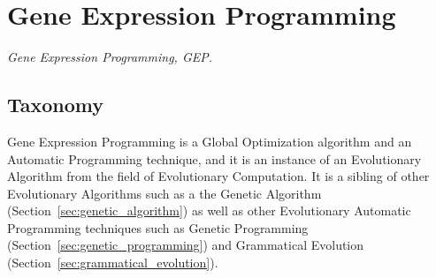 

\section{Gene Expression Programming} 
\label{sec:gene_expression_programming}

\emph{Gene Expression Programming, GEP.}

\subsection{Taxonomy}
Gene Expression Programming is a Global Optimization algorithm and an Automatic Programming technique, and it is an instance of an Evolutionary Algorithm from the field of Evolutionary Computation.
It is a sibling of other Evolutionary Algorithms such as a the Genetic Algorithm (Section~\ref{sec:genetic_algorithm}) as well as other Evolutionary Automatic Programming techniques such as Genetic Programming (Section~\ref{sec:genetic_programming}) and Grammatical Evolution (Section~\ref{sec:grammatical_evolution}).


